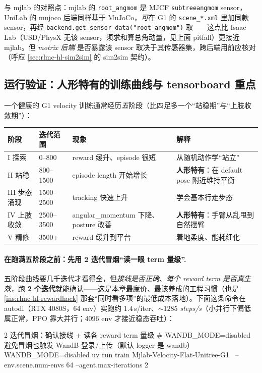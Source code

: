 与 mjlab 的对照点：mjlab 的 \texttt{root\_angmom} 是 MJCF \texttt{subtreeangmom} sensor，UniLab 的 mujoco 后端同样基于 MuJoCo，\emph{可}在 G1 的 \texttt{scene\_*.xml} 里加同款 sensor，再经 \texttt{backend.get\_sensor\_data("root\_angmom")} 取——这点比 Isaac Lab（USD/PhysX 无该 sensor，须求和算总角动量，见上面 pitfall）更接近 mjlab。但 \emph{motrix 后端} 是否暴露该 sensor 取决于其传感器集，跨后端用前应核对（呼应 \cref{sec:rlmc-hl-sim2sim} 的 sim2sim 契约）。

\subsection{运行验证：人形特有的训练曲线与 tensorboard 重点}
一个健康的 G1 velocity 训练通常经历\emph{五}阶段（比四足多一个“站稳期”与“上肢收敛期”）：

\begin{center}
\small
\begin{tabular}{p{2.4cm}p{1.8cm}p{3.6cm}p{3.6cm}}
\hline
阶段 & 迭代范围 & 现象 & 解释 \\
\hline
I 探索 & 0--800 & reward 缓升、episode 很短 & 从随机动作学“站立” \\
II 站稳 & 800--1500 & episode length 开始增长 & \textbf{人形特有}：在 default pose 附近维持平衡 \\
III 步态涌现 & 1500--2500 & tracking 快速上升 & 学会基本行走步态 \\
IV 上肢收敛 & 2500--3500 & angular\_momentum 下降、posture 改善 & \textbf{人形特有}：手臂从乱甩到自然摆臂 \\
V 精修 & 3500+ & reward 缓升到平台 & 着地柔度、能耗细化 \\
\hline
\end{tabular}
\end{center}

\paragraph{在跑满五阶段之前：先用 2 迭代冒烟“读一眼 term 量级”.}
五阶段曲线要几千迭代才看得全，但\emph{接线是否正确}、\emph{每个 reward term 是否真生效}，跑 \textbf{2 个迭代}就能确认——这是本章最廉价、最该养成的工程习惯（也是 \cref{ins:rlmc-hl-rewardhack} 那套“同时看多项”的最低成本落地）。下面这条命令在 autodl（RTX 4080S，64 env）实跑约 $1.4$\,s/iter、\emph{$\sim 1285$ steps/s}（小并行下偏低属正常，PPO 靠大并行；4096 env 才接近稳态吞吐）：

\begin{codebox}[bash]{2 迭代冒烟：确认接线 + 读各 reward term 量级}
# WANDB_MODE=disabled 避免冒烟也触发 WandB 登录/上传（默认 logger 是 wandb）
WANDB_MODE=disabled uv run train Mjlab-Velocity-Flat-Unitree-G1 \
  --env.scene.num-envs 64 --agent.max-iterations 2
\end{codebox}

